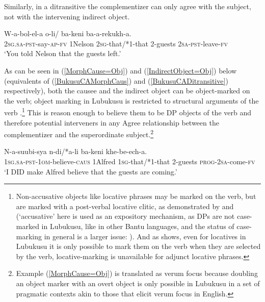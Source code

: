 \documentclass[output=paper
,modfonts
,nonflat
]{langsci/langscibook}
\begin{document}
\noindent Similarly, in a ditransitive the complementizer can only agree with the subject, not with the intervening indirect object.

\ea \label{BukusuCADitransitive}
\gll W-a-bol-el-a  o-li/ ba-keni ba-a-rekukh-a. \\
2\textsc{sg}.\textsc{sa}-\textsc{pst}-say-\textsc{ap}-\textsc{fv}	1Nelson	2\textsc{sg}-that/*1-that	2-guests	2\textsc{sa}-\textsc{pst}-leave-\textsc{fv} \\
\glt `You told Nelson that the guests left.'

\z

As can be seen in (\ref{MorphCause=Obj}) and (\ref{IndirectObject=Obj}) below (equivalents of (\ref{BukusuCAMorphCaus}) and (\ref{BukusuCADitransitive}) respectively), both the causee and the indirect object can be object-marked on the verb; object marking in Lubukusu is restricted to structural arguments of the verb \citep{Diercks:2011,SikukuEt:2017}.\footnote{Non-accusative objects like locative phrases may be marked on the verb, but are marked with a post-verbal locative clitic, as demonstrated by \citet{Diercks:2010,Diercks:2011} and \citet{SikukuEt:2017} (`accusative' here is used as an expository mechanism, as DPs are not case-marked in Lubukusu, like in other Bantu languages, and the status of case-marking in general is a larger issue: \citealt{Harford:1985,Halpert:2012,Diercks:2012,vanderwal:2015}). And as \citet{Diercks:2011} shows, even for locatives in Lubukusu it is only possible to mark them on the verb when they are selected by the verb, locative-marking is unavailable for adjunct locative phrases.}  This is reason enough to believe them to be DP objects of the verb and therefore potential interveners in any Agree relationship between the complementizer and the superordinate subject.\footnote{Example (\ref{MorphCause=Obj}) is translated as verum focus because doubling an object marker with an overt object is only possible in Lubukusu in a set of pragmatic contexts akin to those that elicit verum focus in English.}

\newpage 

\ea \label{MorphCause=Obj}
\gll N-a-suubi-sya  n-di/*a-li ba-keni khe-be-ech-a.	\\
1\textsc{sg}.\textsc{sa}-\textsc{pst}-1\textsc{om}-believe-\textsc{caus} 1Alfred 1\textsc{sg}-that/*1-that 2-guests \textsc{prog}-2\textsc{sa}-come-\textsc{fv} \\
\glt `I DID make Alfred believe that the guests are coming.'
\z
\end{document}
